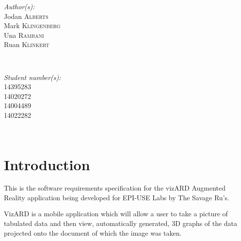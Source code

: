 \documentclass[a4paper,12pt]{article}
\begin{document}
\begin{titlepage}
\begin{minipage}{0.4\textwidth}
\begin{flushleft} \large
\emph{Author(s):}\\
Jodan \textsc{Alberts}\\ %
Mark \textsc{Klingenberg}\\
Una \textsc{Rambani}\\
Ruan \textsc{Klinkert}\\
\end{flushleft}
\end{minipage}
~
\begin{minipage}{0.4\textwidth}
\begin{flushright} \large
\emph{Student number(s):} \\
14395283\\ %
14020272\\
14004489\\
14022282\\

\end{flushright}
\end{minipage}\\[4cm]


 

\vfill %

\end{titlepage}

\newpage

\tableofcontents

\newpage

\section{Introduction}

This is the software requirements specification for the vizARD Augmented Reality application being developed for EPI-USE Labs by The Savage Ru's.

VizARD is a mobile application which will allow a user to take a picture of tabulated data and then view, automatically generated, 3D graphs of the data projected onto the document of which the image was taken.
\end{document}
